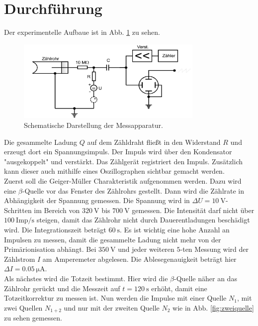 \section{Durchführung}
\label{sec:Durchführung}
Der experimentelle Aufbaue ist in Abb. \ref{fig:aufbau} zu sehen.
\begin{figure}
    \centering
    \includegraphics[width=0.8\textwidth]{content/data/aufbau.jpg}
    \caption{Schematische Darstellung der Messapparatur. \cite[7]{anleitung}}
    \label{fig:aufbau}
\end{figure}
Die gesammelte Ladung $Q$ auf dem Zähldraht fließt in den Widerstand $R$ und erzeugt dort ein Spannungsimpuls.
Der Impuls wird über den Kondensator "ausgekoppelt" und verstärkt.
Das Zählgerät registriert den Impuls.
Zusätzlich kann dieser auch mithilfe eines Oszillographen sichtbar gemacht werden.
\\
Zuerst soll die Geiger-Müller Charakteristik aufgenommen werden.
Dazu wird eine $\beta$-Quelle vor das Fenster des Zählrohrs gestellt.
Dann wird die Zählrate in Abhängigkeit der Spannung gemessen.
Die Spannung wird in $\Delta U = \SI{10}{\volt}$-Schritten im Bereich von $\SI{320}{\volt}$ bis $\SI{700}{\volt}$ gemessen.
Die Intensität darf nicht über $\SI{100}{\text{Imp}/\second}$ steigen, damit das Zählrohr nicht durch Dauerentladungen beschädigt wird.
Die Integrationszeit beträgt $\SI{60}{\second}$.
Es ist wichtig eine hohe Anzahl an Impulsen zu messen, damit die gesammelte Ladung nicht mehr von der Primärionisation abhängt.
Bei $\SI{350}{\volt}$ und jeder weiteren $5$-ten Messung wird der Zählstrom $I$ am Amperemeter abgelesen.
Die Ablesegenauigkeit beträgt hier $\Delta I = \SI{0.05}{\micro \ampere}$.
\\
Als nächstes wird die Totzeit bestimmt.
Hier wird die $\beta$-Quelle näher an das Zählrohr gerückt und die Messzeit auf $t = \SI{120}{\second}$ erhöht, damit eine Totzeitkorrektur zu messen ist.
Nun werden die Impulse mit einer Quelle $N_1$, mit zwei Quellen $N_{1+2}$ und nur mit der zweiten Quelle $N_{2}$ wie in Abb. \ref{fig:zweiquelle} zu sehen gemessen.
